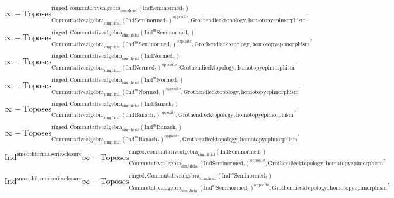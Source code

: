 \documentclass[11pt]{book}
\theoremstyle{definition}
\numberwithin{equation}{section}
\begin{document}
\begin{align}
&\infty-\mathrm{Toposes}^{\mathrm{ringed},\mathrm{commutativealgebra}_{\mathrm{simplicial}}(\mathrm{Ind}\mathrm{Seminormed}_?)}_{\mathrm{Commutativealgebra}_{\mathrm{simplicial}}(\mathrm{Ind}\mathrm{Seminormed}_?)^\mathrm{opposite},\mathrm{Grothendiecktopology,homotopyepimorphism}}.\\
&\infty-\mathrm{Toposes}^{\mathrm{ringed},\mathrm{Commutativealgebra}_{\mathrm{simplicial}}(\mathrm{Ind}^m\mathrm{Seminormed}_?)}_{\mathrm{Commutativealgebra}_{\mathrm{simplicial}}(\mathrm{Ind}^m\mathrm{Seminormed}_?)^\mathrm{opposite},\mathrm{Grothendiecktopology,homotopyepimorphism}}.\\
&\infty-\mathrm{Toposes}^{\mathrm{ringed},\mathrm{Commutativealgebra}_{\mathrm{simplicial}}(\mathrm{Ind}\mathrm{Normed}_?)}_{\mathrm{Commutativealgebra}_{\mathrm{simplicial}}(\mathrm{Ind}\mathrm{Normed}_?)^\mathrm{opposite},\mathrm{Grothendiecktopology,homotopyepimorphism}}.\\
&\infty-\mathrm{Toposes}^{\mathrm{ringed},\mathrm{Commutativealgebra}_{\mathrm{simplicial}}(\mathrm{Ind}^m\mathrm{Normed}_?)}_{\mathrm{Commutativealgebra}_{\mathrm{simplicial}}(\mathrm{Ind}^m\mathrm{Normed}_?)^\mathrm{opposite},\mathrm{Grothendiecktopology,homotopyepimorphism}}.\\
&\infty-\mathrm{Toposes}^{\mathrm{ringed},\mathrm{Commutativealgebra}_{\mathrm{simplicial}}(\mathrm{Ind}\mathrm{Banach}_?)}_{\mathrm{Commutativealgebra}_{\mathrm{simplicial}}(\mathrm{Ind}\mathrm{Banach}_?)^\mathrm{opposite},\mathrm{Grothendiecktopology,homotopyepimorphism}}.\\
&\infty-\mathrm{Toposes}^{\mathrm{ringed},\mathrm{Commutativealgebra}_{\mathrm{simplicial}}(\mathrm{Ind}^m\mathrm{Banach}_?)}_{\mathrm{Commutativealgebra}_{\mathrm{simplicial}}(\mathrm{Ind}^m\mathrm{Banach}_?)^\mathrm{opposite},\mathrm{Grothendiecktopology,homotopyepimorphism}}.\\ 
&\mathrm{Ind}^\text{smoothformalseriesclosure}\infty-\mathrm{Toposes}^{\mathrm{ringed},\mathrm{commutativealgebra}_{\mathrm{simplicial}}(\mathrm{Ind}\mathrm{Seminormed}_?)}_{\mathrm{Commutativealgebra}_{\mathrm{simplicial}}(\mathrm{Ind}\mathrm{Seminormed}_?)^\mathrm{opposite},\mathrm{Grothendiecktopology,homotopyepimorphism}}. \\
&\mathrm{Ind}^\text{smoothformalseriesclosure}\infty-\mathrm{Toposes}^{\mathrm{ringed},\mathrm{Commutativealgebra}_{\mathrm{simplicial}}(\mathrm{Ind}^m\mathrm{Seminormed}_?)}_{\mathrm{Commutativealgebra}_{\mathrm{simplicial}}(\mathrm{Ind}^m\mathrm{Seminormed}_?)^\mathrm{opposite},\mathrm{Grothendiecktopology,homotopyepimorphism}}.\\

\end{align}
\end{document}
